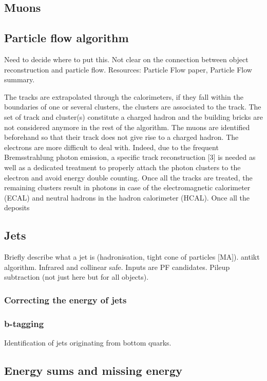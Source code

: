 \subsection{Muons}

\subsection{Particle flow algorithm}
Need to decide where to put this. Not clear on the connection between object 
reconstruction and particle flow.
Resources: Particle Flow paper, Particle Flow summary.

The tracks are extrapolated through the calorimeters, if they fall within the 
boundaries of one or several clusters, the clusters are associated to the 
track. The set of track and cluster(s) constitute a charged hadron and the 
building bricks are not considered anymore in the rest of the algorithm. The 
muons are identified beforehand so that their track does not give rise to a 
charged hadron. The electrons are more difficult to deal with. Indeed, due to 
the frequent Bremsstrahlung photon emission, a specific track reconstruction [3]
is needed as well as a dedicated treatment to properly attach the photon 
clusters to the electron and avoid energy double counting. Once all the tracks 
are treated, the remaining clusters result in photons in case of the 
electromagnetic calorimeter (ECAL) and neutral hadrons in the hadron 
calorimeter (HCAL). Once all the deposits

\subsection{Jets}

Briefly describe what a jet is (hadronisation, tight cone of particles [MA]).
antikt algorithm. Infrared and collinear safe.
Inputs are PF candidates. Pileup subtraction (not just here but for all 
objects).

\subsubsection{Correcting the energy of jets}

\subsubsection{b-tagging}
Identification of jets originating from bottom quarks.

\subsection{Energy sums and missing energy}

